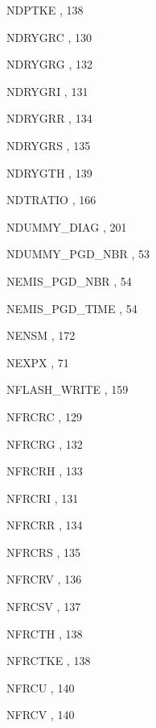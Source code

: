 \begin{theindex}
  \item NDPTKE
    \subitem {},  138
  \item NDRYGRC
    \subitem {},  130
  \item NDRYGRG
    \subitem {},  132
  \item NDRYGRI
    \subitem {},  131
  \item NDRYGRR
    \subitem {},  134
  \item NDRYGRS
    \subitem {},  135
  \item NDRYGTH
    \subitem {},  139
  \item NDTRATIO
    \subitem {},  166
  \item NDUMMY\_DIAG
    \subitem {},  201
  \item NDUMMY\_PGD\_NBR
    \subitem {},  53
  \item NEMIS\_PGD\_NBR
    \subitem {},  54
  \item NEMIS\_PGD\_TIME
    \subitem {},  54
  \item NENSM
    \subitem {},  172
  \item NEXPX
    \subitem {},  71
  \item NFLASH\_WRITE
    \subitem {},  159
  \item NFRCRC
    \subitem {},  129
  \item NFRCRG
    \subitem {},  132
  \item NFRCRH
    \subitem {},  133
  \item NFRCRI
    \subitem {},  131
  \item NFRCRR
    \subitem {},  134
  \item NFRCRS
    \subitem {},  135
  \item NFRCRV
    \subitem {},  136
  \item NFRCSV
    \subitem {},  137
  \item NFRCTH
    \subitem {},  138
  \item NFRCTKE
    \subitem {},  138
  \item NFRCU
    \subitem {},  140
  \item NFRCV
    \subitem {},  140

\end{theindex}
